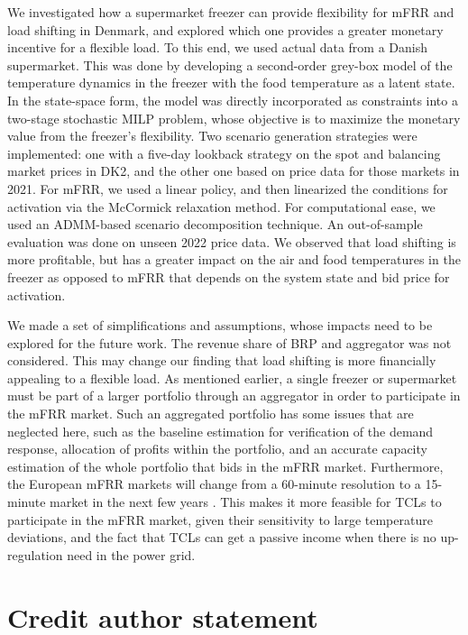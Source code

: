 \documentclass[11pt,a4paper]{article}
\begin{document}
We investigated how a supermarket freezer can provide flexibility for mFRR and load shifting in Denmark, and explored which one provides a greater monetary incentive for a flexible load. To this end, we used actual data  from a Danish supermarket. This was done by developing a second-order grey-box model of the temperature dynamics in the freezer with the food temperature as a latent state. In the state-space form, the model was directly incorporated as constraints into a two-stage stochastic MILP problem, whose objective is to maximize the monetary value from the freezer's flexibility. Two scenario generation strategies were implemented: one with a five-day lookback strategy on the spot and balancing market prices in DK2, and the other one  based on price data for those markets in 2021. For mFRR, we used a linear policy, and then linearized the conditions for activation via the McCormick relaxation method. For computational ease, we used an ADMM-based scenario decomposition technique.  An out-of-sample evaluation was done on unseen 2022 price data. We observed that load shifting is more profitable, but has a greater impact on the air and food temperatures in the freezer as opposed to mFRR that depends on the system state and bid price for activation.

We made a set of simplifications and assumptions, whose impacts need to be explored for the future work. The revenue share of BRP and aggregator was not considered. This may change our finding that load shifting is more financially appealing to a flexible load. As mentioned earlier, a single freezer or supermarket must be part of a larger portfolio through an aggregator in order to participate in the mFRR market. Such an aggregated portfolio has some issues that are neglected here, such as the baseline estimation for verification of the demand response, allocation of profits within the portfolio, and an accurate capacity estimation of the whole portfolio that bids in the mFRR market. Furthermore, the European mFRR markets will change from a 60-minute resolution to a 15-minute market in the next few years \cite{MARI}. This makes it more feasible for TCLs to participate in the mFRR market, given their sensitivity to large temperature deviations, and the fact that TCLs can get a passive income when there is no up-regulation need in the power grid.

\section*{Credit author statement}
\end{document}
